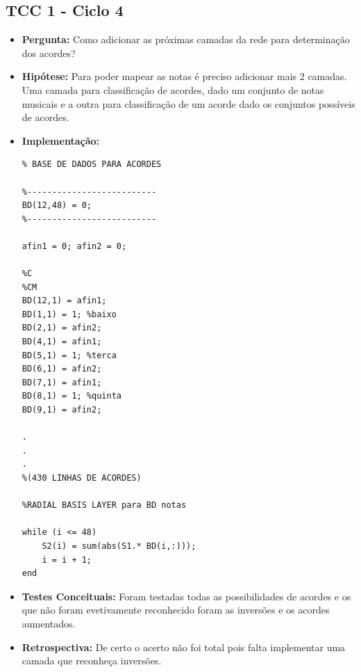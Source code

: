 \subsection{TCC 1 - Ciclo 4}
\begin{itemize}
\item \textbf{Pergunta:} Como adicionar as próximas camadas da rede para determinação dos acordes?
\item \textbf{Hipótese:} Para poder mapear as notas é preciso adicionar mais 2 camadas. Uma camada para classificação de acordes, dado um conjunto de notas musicais e a outra para classificação de um acorde dado os conjuntos possíveis de acordes.
\item \textbf{Implementação:} 
\begin{lstlisting}
% BASE DE DADOS PARA ACORDES

%--------------------------
BD(12,48) = 0;
%--------------------------

afin1 = 0; afin2 = 0;

%C
%CM
BD(12,1) = afin1;
BD(1,1) = 1; %baixo
BD(2,1) = afin2;
BD(4,1) = afin1;
BD(5,1) = 1; %terca
BD(6,1) = afin2;
BD(7,1) = afin1;
BD(8,1) = 1; %quinta
BD(9,1) = afin2;

.
.
.
%(430 LINHAS DE ACORDES)

%RADIAL BASIS LAYER para BD notas

while (i <= 48)
    S2(i) = sum(abs(S1.* BD(i,:)));
    i = i + 1;
end

\end{lstlisting}
\item \textbf{Testes Conceituais:} Foram testadas todas as possibilidades de acordes e os que não foram evetivamente reconhecido foram as inversões e os acordes aumentados.
\item \textbf{Retrospectiva:} De certo o acerto não foi total pois falta implementar uma camada que reconheça inversões.
\end{itemize}

